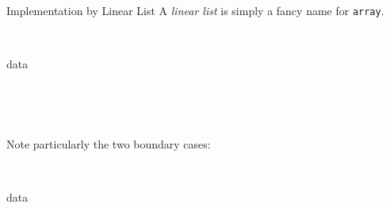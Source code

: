 \begin{frame}{Implementation by Linear List}
A \textit{linear list} is simply a fancy name for \texttt{array}. 

\begin{bytefield}[leftcurly=., leftcurlyspace=0pt]{36}
	\begin{leftwordgroup}{}
	\end{leftwordgroup}\\
	\begin{leftwordgroup}{data}
	\end{leftwordgroup}\\
	\begin{leftwordgroup}{}
	\end{leftwordgroup}\\
\end{bytefield}

\vspace{-.2in}
Note particularly the two boundary cases:

\begin{bytefield}[leftcurly=., leftcurlyspace=0pt]{36}
	\begin{leftwordgroup}{}
	\end{leftwordgroup}\\
	\begin{leftwordgroup}{data}
	\end{leftwordgroup}\\
	\begin{leftwordgroup}{}
	\end{leftwordgroup}\\
\end{bytefield}


\end{frame}
